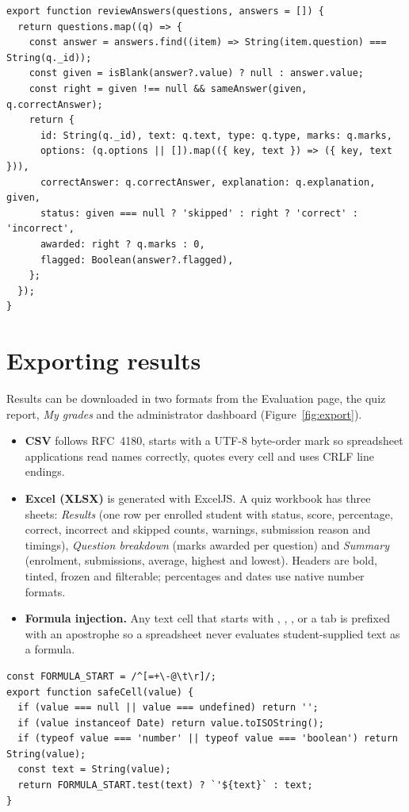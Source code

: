\documentclass[12pt,a4paper,oneside]{report}
\newcommand{\code}[1]{\texttt{\detokenize{#1}}}
\begin{document}
\begin{lstlisting}[caption={Per-question review used by the student and teacher result pages},label={lst:review}]
export function reviewAnswers(questions, answers = []) {
  return questions.map((q) => {
    const answer = answers.find((item) => String(item.question) === String(q._id));
    const given = isBlank(answer?.value) ? null : answer.value;
    const right = given !== null && sameAnswer(given, q.correctAnswer);
    return {
      id: String(q._id), text: q.text, type: q.type, marks: q.marks,
      options: (q.options || []).map(({ key, text }) => ({ key, text })),
      correctAnswer: q.correctAnswer, explanation: q.explanation, given,
      status: given === null ? 'skipped' : right ? 'correct' : 'incorrect',
      awarded: right ? q.marks : 0,
      flagged: Boolean(answer?.flagged),
    };
  });
}
\end{lstlisting}

\section{Exporting results}
Results can be downloaded in two formats from the Evaluation page, the quiz report, \emph{My grades} and the
administrator dashboard (Figure~\ref{fig:export}).
\begin{itemize}
  \item \textbf{CSV} follows RFC~4180, starts with a UTF-8 byte-order mark so spreadsheet applications read names correctly, quotes every cell and uses CRLF line endings.
  \item \textbf{Excel (XLSX)} is generated with ExcelJS. A quiz workbook has three sheets: \emph{Results} (one row per enrolled student with status, score, percentage, correct, incorrect and skipped counts, warnings, submission reason and timings), \emph{Question breakdown} (marks awarded per question) and \emph{Summary} (enrolment, submissions, average, highest and lowest). Headers are bold, tinted, frozen and filterable; percentages and dates use native number formats.
  \item \textbf{Formula injection.} Any text cell that starts with \code{=}, \code{+}, \code{-}, \code{@} or a tab is prefixed with an apostrophe so a spreadsheet never evaluates student-supplied text as a formula.
\end{itemize}

\begin{lstlisting}[caption={CSV cells are neutralised before quoting},label={lst:csv}]
const FORMULA_START = /^[=+\-@\t\r]/;
export function safeCell(value) {
  if (value === null || value === undefined) return '';
  if (value instanceof Date) return value.toISOString();
  if (typeof value === 'number' || typeof value === 'boolean') return String(value);
  const text = String(value);
  return FORMULA_START.test(text) ? `'${text}` : text;
}
\end{lstlisting}
\end{document}
